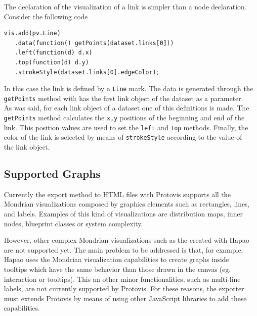 \documentclass[preprint,10pt]{sigplanconf}
\newcommand{\ct}{\lstinline[backgroundcolor=\color{white},basicstyle=\footnotesize\ttfamily]}
\newcommand{\ab}[1]{\nb{Alexandre}{blue}{#1}}
\newcommand{\sv}[1]{\nb{Santiago}{orange}{#1}}
\begin{document}
The declaration of the visualization of a link is simpler than a node declaration. Consider the following code 
\begin{lstlisting} 
vis.add(pv.Line)
   .data(function() getPoints(dataset.links[0]))
   .left(function(d) d.x)
   .top(function(d) d.y)
   .strokeStyle(dataset.links[0].edgeColor);
\end{lstlisting}
In this case the link is defined by a \ct{Line} mark. The data is generated through the \ct{getPoints} method with has the first link object of the dataset as a parameter. As was said, for each link object of a dataset one of this definitions is made. The \ct{getPoints} method calculates the \ct{x,y} positions of the beginning and end of the link. This position values are used to set the \ct{left} and \ct{top} methods. Finally, the color of the link is selected by means of \ct{strokeStyle} according to the value of the link object.

\subsection{Supported Graphs}


Currently the export method to HTML files with Protovis supports all the Mondrian visualizations composed by graphics elements such as rectangles, lines, and labels. Examples of this kind of visualizations are distribution maps, inner nodes, blueprint classes or system complexity. 
 
However, other complex Mondrian visualizations such as the created with Hapao are not supported yet. The main problem to be addressed is that, for example, Hapao uses the Mondrian visualization capabilities to create graphs inside tooltips which have the same behavior than those drawn in the canvas (eg. interaction or tooltips). This an other minor functionalities, such as multi-line labels, are not currently supported by Protovis. For these reasons, the exporter must extends Protovis by means of using other JavaScript libraries to add these capabilities.
\end{document}
